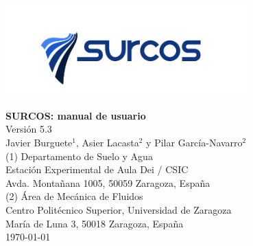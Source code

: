 \documentclass[11pt, twoside, openany, a4paper]{book}
\begin{document}

\nocite{*}

\renewcommand{\tablename}{Tabla}
\renewcommand{\listtablename}{Índice de tablas}
\renewcommand{\bibname}{Bibliografía}

\pagestyle{empty}

\begin{titlepage} 
\begin{center} 
 
\includegraphics*[height=3.5cm]{images/logo_surcos.png} 

\vspace*{3.5cm} 
{\Huge \textbf{SURCOS: manual de usuario\\}}
\vspace*{1cm} 
{\normalsize Versión 5.3}\\
\vspace*{1cm} 
{\Large Javier Burguete$^1$, Asier Lacasta$^2$ y Pilar García-Navarro$^2$}\\ 
\vspace*{2.5cm} 
{\normalsize (1) Departamento de Suelo y Agua}\\
{Estación Experimental de Aula Dei / CSIC}\\ 
{Avda. Montañana 1005, 50059 Zaragoza, España}\\ 
\vspace*{1cm} 
{\normalsize (2) Área de Mecánica de Fluidos}\\ 
{Centro Politécnico Superior, Universidad de Zaragoza}\\
{María de Luna 3, 50018 Zaragoza, España}\\
\vspace*{1cm} 
{\normalsize \today}\\ 
\end{center} 
\end{titlepage} 
\cleardoublepage

\pagestyle{plain}

\tableofcontents
\listoffigures

\cleardoublepage

\pagestyle{headings}


\cleardoublepage


\cleardoublepage


\cleardoublepage

%
\end{document}

